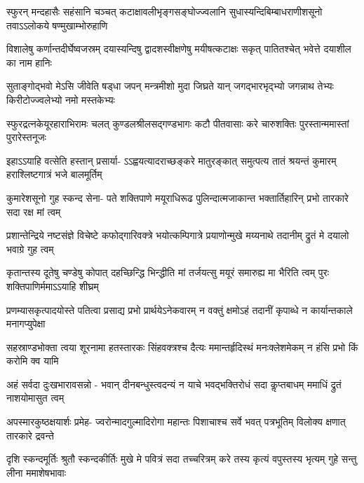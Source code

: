 \fourlineindentedshloka
{स्फुरन् मन्दहासैः सहंसानि चञ्चत्}
{कटाक्षावलीभृङ्गसङ्घोज्ज्वलानि}
{सुधास्यन्दिबिम्बाधराणीशसूनो}
{तवाऽऽलोकये षण्मुखाम्भोरुहाणि}

\fourlineindentedshloka
{विशालेषु कर्णान्तदीर्घेष्वजस्रम्}
{दयास्यन्दिषु द्वादशस्वीक्षणेषु}
{मयीषत्कटाक्षः सकृत् पातितश्चेत्}
{भवेत्ते दयाशील का नाम हानिः}

\fourlineindentedshloka
{सुताङ्गोद्भवो मेऽसि जीवेति षड्धा}
{जपन् मन्त्रमीशो मुदा जिघ्रते यान्}
{जगद्भारभृद्भ्यो जगन्नाथ तेभ्यः}
{किरीटोज्ज्वलेभ्यो नमो मस्तकेभ्यः}

\fourlineindentedshloka
{स्फुरद्रत्नकेयूरहाराभिरामः}
{चलत् कुण्डलश्रीलसद्गण्डभागः}
{कटौ पीतवासाः करे चारुशक्तिः}
{पुरस्तान्ममास्तां पुरारेस्तनूजः}

\fourlineindentedshloka
{इहाऽऽयाहि वत्सेति हस्तान् प्रसार्या-}
{ऽऽह्वयत्यादराच्छङ्करे मातुरङ्कात्}
{समुत्पत्य तातं श्रयन्तं कुमारम्}
{हराश्लिष्टगात्रं भजे बालमूर्तिम्}

\fourlineindentedshloka
{कुमारेशसूनो गुह स्कन्द सेना-}
{पते शक्तिपाणे मयूराधिरूढ}
{पुलिन्दात्मजाकान्त भक्तार्तिहारिन्}
{प्रभो तारकारे सदा रक्ष मां त्वम्}

\fourlineindentedshloka
{प्रशान्तेन्द्रिये नष्टसंज्ञे विचेष्टे}
{कफोद्गारिवक्त्रे भयोत्कम्पिगात्रे}
{प्रयाणोन्मुखे मय्यनाथे तदानीम्}
{द्रुतं मे दयालो भवाग्रे गुह त्वम्}

\fourlineindentedshloka
{कृतान्तस्य दूतेषु चण्डेषु कोपात्}
{दहच्छिन्द्धि भिन्द्धीति मां तर्जयत्सु}
{मयूरं समारुह्य मा भैरिति त्वम्}
{पुरः शक्तिपाणिर्ममाऽऽयाहि शीघ्रम्}

\fourlineindentedshloka
{प्रणम्यासकृत्पादयोस्ते पतित्वा}
{प्रसाद्य प्रभो प्रार्थयेऽनेकवारम्}
{न वक्तुं क्षमोऽहं तदानीं कृपाब्धे}
{न कार्यान्तकाले मनागप्युपेक्षा}

\fourlineindentedshloka
{सहस्राण्डभोक्ता त्वया शूरनामा}
{हतस्तारकः सिंहवक्त्रश्च दैत्यः}
{ममान्तर्हृदिस्थं मनःक्लेशमेकम्}
{न हंसि प्रभो किं करोमि क्व यामि}

\fourlineindentedshloka
{अहं सर्वदा दुःखभारावसन्नो -}
{भवान् दीनबन्धुस्त्वदन्यं न याचे}
{भवद्भक्तिरोधं सदा कॢप्तबाधम्}
{ममाधिं द्रुतं नाशयोमासुत त्वम्}

\fourlineindentedshloka
{अपस्मारकुष्ठक्षयार्शः प्रमेह-}
{ज्वरोन्मादगुल्मादिरोगा महान्तः}
{पिशाचाश्च सर्वे भवत् पत्रभूतिम्}
{विलोक्य क्षणात् तारकारे द्रवन्ते}

\fourlineindentedshloka
{दृशि स्कन्दमूर्तिः श्रुतौ स्कन्दकीर्तिः}
{मुखे मे पवित्रं सदा तच्चरित्रम्}
{करे तस्य कृत्यं वपुस्तस्य भृत्यम्}
{गुहे सन्तु लीना ममाशेषभावाः}

